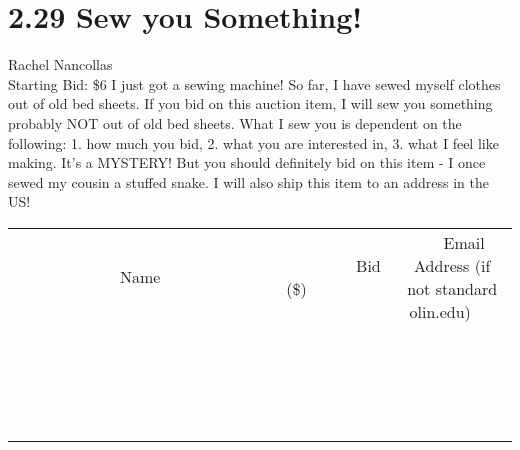 \documentclass[11pt]{article}
\begin{document}
\section*{2.29 Sew you Something!}
Rachel Nancollas
\\
Starting Bid: \$6
\newline
I just got a sewing machine! So far, I have sewed myself clothes out of old bed sheets. If you bid on this auction item, I will sew you something probably NOT out of old bed sheets. What I sew you is dependent on the following: 1. how much you bid, 2. what you are interested in, 3. what I feel like making. It's a MYSTERY! But you should definitely bid on this item - I once sewed my cousin a stuffed snake. I will also ship this item to an address in the US!
\\[3ex]
\begin{tabular}{c c c}
~~~~~~~~~~~~~Name~~~~~~~~~~~~~ & ~~~~~~~~~Bid (\$)~~~~~~~~~  & ~~~Email Address (if not standard olin.edu)~~~\\
 & & \\
\hline
 & & \\
\hline
 & & \\
\hline
 & & \\
\hline
 & & \\
\hline
 & & \\
\hline
 & & \\
\hline
 & & \\
\hline
 & & \\
\hline
 & & \\
\hline
 & & \\
\hline
 & & \\
\hline
 & & \\
\hline
 & & \\
\hline
 & & \\
\hline
 & & \\
\hline
 & & \\
\hline
 & & \\
\hline
 & & \\
\hline
\end{tabular}
\newpage
\end{document}
